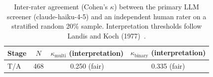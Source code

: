 \begin{table}[htbp]
\centering
\caption{Inter-rater agreement (Cohen's $\kappa$) between the primary LLM screener (claude-haiku-4-5) and an independent human rater on a stratified random 20\% sample. Interpretation thresholds follow Landis and Koch (1977)~\cite{landiskoch1977}.}
\label{tab:human-kappa-results}
\begin{tabular}{lccc}
\toprule
Stage & $N$ & $\kappa_{\text{multi}}$ (interpretation) & $\kappa_{\text{binary}}$ (interpretation) \\
\midrule
T/A & 468 & 0.250 (fair) & 0.335 (fair) \\
\bottomrule
\end{tabular}
\end{table}